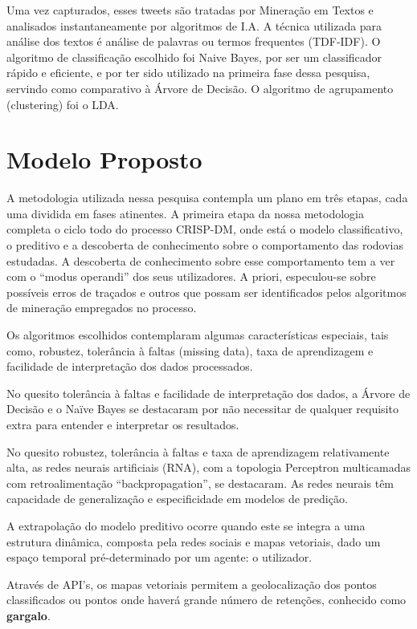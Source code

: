 Uma vez capturados, esses tweets são tratadas por Mineração em Textos e analisados instantaneamente por algoritmos de I.A. 
A técnica utilizada para análise dos textos é análise de palavras ou termos frequentes (TDF-IDF). O algoritmo de classificação escolhido foi Naive Bayes, por ser um classificador rápido e eficiente, e por ter sido utilizado na primeira fase dessa pesquisa, servindo como comparativo à Árvore de Decisão. O algoritmo de agrupamento (clustering) foi o LDA.



\section{Modelo Proposto}

A metodologia utilizada nessa pesquisa contempla um plano em três etapas, cada uma dividida em fases atinentes.
A primeira etapa da nossa metodologia completa o ciclo todo do processo CRISP-DM, onde está o modelo classificativo, o preditivo e 
a descoberta de conhecimento sobre o comportamento das rodovias estudadas. A descoberta de conhecimento sobre esse comportamento 
 tem a ver com o ``modus operandi'' dos seus utilizadores. A priori, especulou-se sobre possíveis erros de traçados e outros que possam
ser identificados pelos algoritmos de mineração empregados no processo.

Os algoritmos escolhidos contemplaram algumas características especiais, tais como, robustez, tolerância à faltas (missing data),
taxa de aprendizagem e facilidade de interpretação dos dados processados. 

No quesito tolerância à faltas e facilidade de interpretação dos dados, a Árvore de Decisão e o Naïve Bayes se destacaram por não necessitar
de qualquer requisito extra para entender e interpretar os resultados.

No quesito robustez, tolerância à faltas e taxa de aprendizagem relativamente alta, as redes neurais artificiais (RNA), com a 
topologia Perceptron multicamadas com retroalimentação ``backpropagation'', se destacaram. 
As redes neurais têm capacidade de generalização e especificidade em modelos de predição. 

A extrapolação do modelo preditivo ocorre quando este se integra a uma estrutura dinâmica, composta pela redes sociais e mapas vetoriais, dado um espaço temporal pré-determinado por um agente: o utilizador. 

Através de API's, os mapas vetoriais permitem a geolocalização dos pontos classificados ou pontos onde haverá grande número de retenções, conhecido como \textbf{gargalo}.

